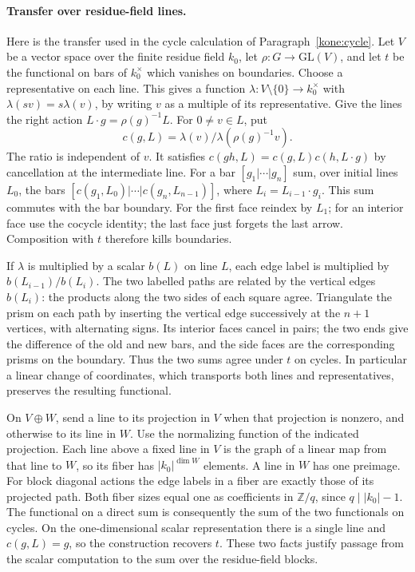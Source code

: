 \paragraph{Transfer over residue-field lines.}\label{kone:lines}
Here is the transfer used in the cycle calculation of
Paragraph~\ref{kone:cycle}. Let $V$ be a vector space over the finite
residue field $k_0$, let $\rho:G\to\mathrm{GL}(V)$, and let $t$ be the
functional on bars of $k_0^\times$ which vanishes on boundaries.
Choose a representative on each line. This gives a function
$\lambda:V\setminus\{0\}\to k_0^\times$ with
$\lambda(sv)=s\lambda(v)$, by writing $v$ as a multiple of its
representative. Give the lines the right action
$L\cdot g=\rho(g)^{-1}L$. For $0\ne v\in L$, put
\[
 c(g,L)=\lambda(v)/\lambda(\rho(g)^{-1}v).
\]
The ratio is independent of $v$. It satisfies
$c(gh,L)=c(g,L)c(h,L\cdot g)$ by cancellation at the intermediate
line. For a bar $[g_1|\cdots|g_n]$ sum, over initial lines $L_0$,
the bars $[c(g_1,L_0)|\cdots|c(g_n,L_{n-1})]$, where
$L_i=L_{i-1}\cdot g_i$. This sum commutes with the bar boundary.
For the first face reindex by $L_1$; for an interior face use the
cocycle identity; the last face just forgets the last arrow.
Composition with $t$ therefore kills boundaries.

If $\lambda$ is multiplied by a scalar $b(L)$ on line $L$, each
edge label is multiplied by $b(L_{i-1})/b(L_i)$. The two labelled
paths are related by the vertical edges $b(L_i)$: the products along
the two sides of each square agree. Triangulate the prism on each
path by inserting the vertical edge successively at the $n+1$
vertices, with alternating signs. Its interior faces cancel in pairs;
the two ends give the difference of the old and new bars, and the
side faces are the corresponding prisms on the boundary. Thus the
two sums agree under $t$ on cycles. In particular a linear change
of coordinates, which transports both lines and representatives,
preserves the resulting functional.

On $V\oplus W$, send a line to its projection in $V$ when that
projection is nonzero, and otherwise to its line in $W$. Use the
normalizing function of the indicated projection. Each line above
a fixed line in $V$ is the graph of a linear map from that line to
$W$, so its fiber has $|k_0|^{\dim W}$ elements. A line in $W$ has
one preimage. For block diagonal actions the edge labels in a fiber
are exactly those of its projected path. Both fiber sizes equal one
as coefficients in $\mathbb Z/q$, since $q\mid |k_0|-1$. The
functional on a direct sum is consequently the sum of the two
functionals on cycles. On the one-dimensional scalar representation
there is a single line and $c(g,L)=g$, so the construction recovers
$t$. These two facts justify passage from the scalar computation to
the sum over the residue-field blocks.
